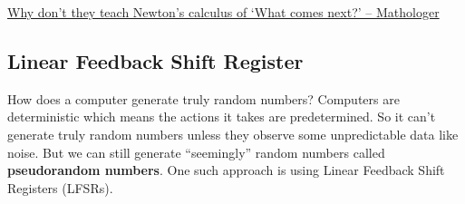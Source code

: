 \begin{funvideo}
	\href{https://youtu.be/4AuV93LOPcE}{Why don't they teach Newton's calculus of `What comes next?' -- Mathologer}
\end{funvideo}
\recalctypearea
\subsection{Linear Feedback Shift Register}
How does a computer generate truly random numbers? Computers are deterministic which means the actions it takes are predetermined. So it can't generate truly random numbers unless they observe some unpredictable data like noise. But we can still generate ``seemingly'' random numbers called \textbf{pseudorandom numbers}. One such approach is using Linear Feedback Shift Registers (LFSRs).

